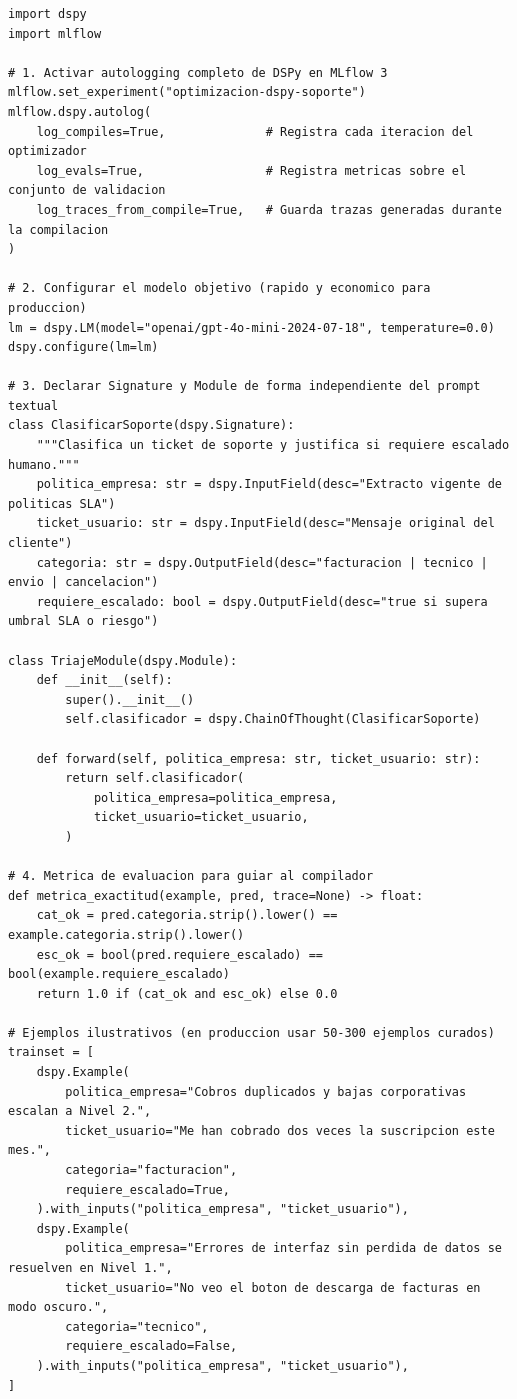 \begin{lstlisting}[style=python, caption={Compilación automática de un módulo RAG/triaje con DSPy (\code{MIPROv2}) y seguimiento completo mediante \code{mlflow.dspy.autolog()}.}, label={lst:dspy-mlflow}]
import dspy
import mlflow

# 1. Activar autologging completo de DSPy en MLflow 3
mlflow.set_experiment("optimizacion-dspy-soporte")
mlflow.dspy.autolog(
    log_compiles=True,              # Registra cada iteracion del optimizador
    log_evals=True,                 # Registra metricas sobre el conjunto de validacion
    log_traces_from_compile=True,   # Guarda trazas generadas durante la compilacion
)

# 2. Configurar el modelo objetivo (rapido y economico para produccion)
lm = dspy.LM(model="openai/gpt-4o-mini-2024-07-18", temperature=0.0)
dspy.configure(lm=lm)

# 3. Declarar Signature y Module de forma independiente del prompt textual
class ClasificarSoporte(dspy.Signature):
    """Clasifica un ticket de soporte y justifica si requiere escalado humano."""
    politica_empresa: str = dspy.InputField(desc="Extracto vigente de politicas SLA")
    ticket_usuario: str = dspy.InputField(desc="Mensaje original del cliente")
    categoria: str = dspy.OutputField(desc="facturacion | tecnico | envio | cancelacion")
    requiere_escalado: bool = dspy.OutputField(desc="true si supera umbral SLA o riesgo")

class TriajeModule(dspy.Module):
    def __init__(self):
        super().__init__()
        self.clasificador = dspy.ChainOfThought(ClasificarSoporte)

    def forward(self, politica_empresa: str, ticket_usuario: str):
        return self.clasificador(
            politica_empresa=politica_empresa,
            ticket_usuario=ticket_usuario,
        )

# 4. Metrica de evaluacion para guiar al compilador
def metrica_exactitud(example, pred, trace=None) -> float:
    cat_ok = pred.categoria.strip().lower() == example.categoria.strip().lower()
    esc_ok = bool(pred.requiere_escalado) == bool(example.requiere_escalado)
    return 1.0 if (cat_ok and esc_ok) else 0.0

# Ejemplos ilustrativos (en produccion usar 50-300 ejemplos curados)
trainset = [
    dspy.Example(
        politica_empresa="Cobros duplicados y bajas corporativas escalan a Nivel 2.",
        ticket_usuario="Me han cobrado dos veces la suscripcion este mes.",
        categoria="facturacion",
        requiere_escalado=True,
    ).with_inputs("politica_empresa", "ticket_usuario"),
    dspy.Example(
        politica_empresa="Errores de interfaz sin perdida de datos se resuelven en Nivel 1.",
        ticket_usuario="No veo el boton de descarga de facturas en modo oscuro.",
        categoria="tecnico",
        requiere_escalado=False,
    ).with_inputs("politica_empresa", "ticket_usuario"),
]


\end{lstlisting}
